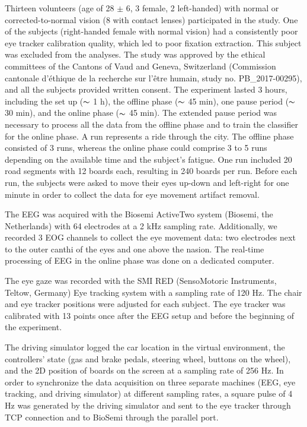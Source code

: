\documentclass[12pt]{iopart}
\begin{document}
Thirteen volunteers (age of 28 $\pm$ 6, 3 female, 2 left-handed) with normal or
corrected-to-normal vision (8 with contact lenses) participated in the study.
One of the subjects (right-handed female with normal vision)
had a consistently poor eye tracker calibration quality, which led
to poor fixation extraction. This subject was excluded from the analyses.
The study was approved by the ethical committees of the 
Cantons of Vaud and Geneva, Switzerland (Commission cantonale
d'\'ethique de la recherche sur l'\^etre humain, study no. PB\_2017-00295),
and all the subjects provided written consent.
The experiment lasted 3 hours, including the set up ($\thicksim$ 1 h), the offline phase ($\thicksim$ 45 min),
one pause period ($\thicksim$ 30 min), and the online phase ($\thicksim$ 45 min).
The extended pause period was necessary to process all the data
from the offline phase and to train the classifier for the online phase.
A run represents a ride through the city. The offline phase consisted of 3 runs, whereas the online
phase could comprise 3 to 5 runs depending on the available time
and the subject's fatigue.
One run included 20 road segments with 12 boards each, resulting in 240 boards per run.
Before each run, the subjects were asked to move their eyes up-down and left-right
for one minute in order to collect the data for eye movement artifact removal.

The EEG was acquired with the Biosemi ActiveTwo system (Biosemi, the Netherlands) with 64 electrodes at a 2 kHz sampling rate.
Additionally, we recorded 3 EOG channels to collect the eye movement data:
two electrodes next to the outer canthi of the eyes and one above the nasion.
The real-time processing
of EEG in the online phase was done on a dedicated computer.

The eye gaze was recorded with the SMI RED (SensoMotoric Instruments, Teltow, Germany) Eye tracking system 
with a sampling rate of 120 Hz.
The chair and eye tracker positions were adjusted for each subject.
The eye tracker
was calibrated with 13 points once after the EEG setup and before the beginning of 
the experiment.

The driving simulator logged the car location in the virtual environment,
the controllers' state (gas and brake pedals, steering wheel,
buttons on the wheel),
and the 2D position of boards on the screen at a sampling rate
of 256 Hz. In order to synchronize the data acquisition on three separate machines
(EEG, eye tracking, and driving simulator) at different sampling rates,
a square pulse of 4 Hz was generated by the driving simulator and sent 
to the eye tracker through TCP connection and to BioSemi through the parallel port.
\end{document}
